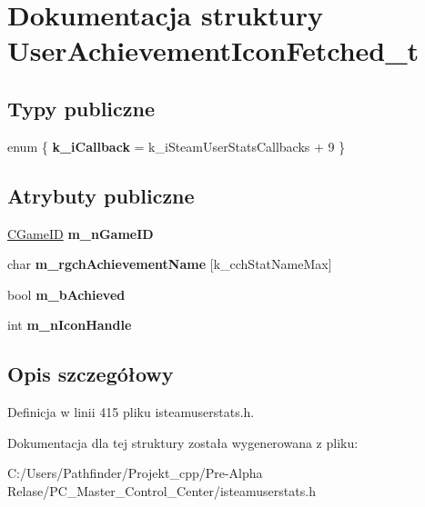 \hypertarget{struct_user_achievement_icon_fetched__t}{}\section{Dokumentacja struktury User\+Achievement\+Icon\+Fetched\+\_\+t}
\label{struct_user_achievement_icon_fetched__t}
\subsection*{Typy publiczne}
\begin{DoxyCompactItemize}
\item 
\mbox{\label{struct_user_achievement_icon_fetched__t_a9b0047558318aa94b9978e47ab6fcf53}} 
enum \{ {\bfseries k\+\_\+i\+Callback} = k\+\_\+i\+Steam\+User\+Stats\+Callbacks + 9
 \}
\end{DoxyCompactItemize}
\subsection*{Atrybuty publiczne}
\begin{DoxyCompactItemize}
\item 
\mbox{\label{struct_user_achievement_icon_fetched__t_a39d822c01f836991536708f24b4f1bdc}} 
\hyperlink{class_c_game_i_d}{C\+Game\+ID} {\bfseries m\+\_\+n\+Game\+ID}
\item 
\mbox{\label{struct_user_achievement_icon_fetched__t_abcbf19d755c61a1d4f7250d93b90e94d}} 
char {\bfseries m\+\_\+rgch\+Achievement\+Name} \mbox{[}k\+\_\+cch\+Stat\+Name\+Max\mbox{]}
\item 
\mbox{\label{struct_user_achievement_icon_fetched__t_a86ab06d08c4602cea75e50b08759a96e}} 
bool {\bfseries m\+\_\+b\+Achieved}
\item 
\mbox{\label{struct_user_achievement_icon_fetched__t_a984215f3c758fb1b40070cd5efab44d2}} 
int {\bfseries m\+\_\+n\+Icon\+Handle}
\end{DoxyCompactItemize}


\subsection{Opis szczegółowy}


Definicja w linii 415 pliku isteamuserstats.\+h.



Dokumentacja dla tej struktury została wygenerowana z pliku\+:\begin{DoxyCompactItemize}
\item 
C\+:/\+Users/\+Pathfinder/\+Projekt\+\_\+cpp/\+Pre-\/\+Alpha Relase/\+P\+C\+\_\+\+Master\+\_\+\+Control\+\_\+\+Center/isteamuserstats.\+h\end{DoxyCompactItemize}
